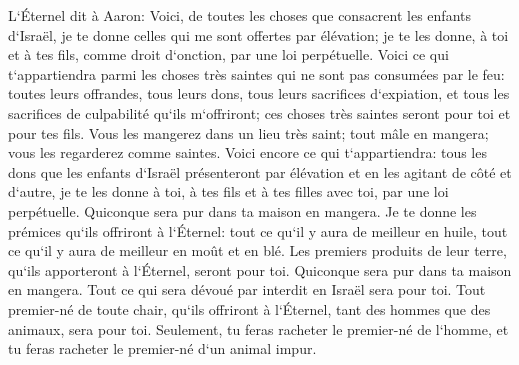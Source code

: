\verse L`Éternel dit à Aaron: Voici, de toutes les choses que consacrent les enfants d`Israël, je te donne celles qui me sont offertes par élévation; je te les donne, à toi et à tes fils, comme droit d`onction, par une loi perpétuelle. 
\verse Voici ce qui t`appartiendra parmi les choses très saintes qui ne sont pas consumées par le feu: toutes leurs offrandes, tous leurs dons, tous leurs sacrifices d`expiation, et tous les sacrifices de culpabilité qu`ils m`offriront; ces choses très saintes seront pour toi et pour tes fils. 
\verse Vous les mangerez dans un lieu très saint; tout mâle en mangera; vous les regarderez comme saintes. 
\verse Voici encore ce qui t`appartiendra: tous les dons que les enfants d`Israël présenteront par élévation et en les agitant de côté et d`autre, je te les donne à toi, à tes fils et à tes filles avec toi, par une loi perpétuelle. Quiconque sera pur dans ta maison en mangera. 
\verse Je te donne les prémices qu`ils offriront à l`Éternel: tout ce qu`il y aura de meilleur en huile, tout ce qu`il y aura de meilleur en moût et en blé. 
\verse Les premiers produits de leur terre, qu`ils apporteront à l`Éternel, seront pour toi. Quiconque sera pur dans ta maison en mangera. 
\verse Tout ce qui sera dévoué par interdit en Israël sera pour toi. 
\verse Tout premier-né de toute chair, qu`ils offriront à l`Éternel, tant des hommes que des animaux, sera pour toi. Seulement, tu feras racheter le premier-né de l`homme, et tu feras racheter le premier-né d`un animal impur. 
